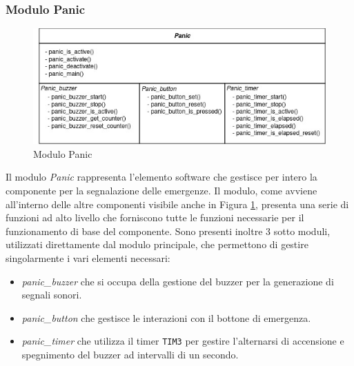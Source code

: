 \documentclass{article}
\begin{document}
	\subsubsection{Modulo Panic}
	\begin{figure}[ht]
		\centering
		\includegraphics[scale=0.4]{./images/Panic.jpg}
		\caption{Modulo Panic}
		\label{img:panic}
	\end{figure}
	\noindent Il modulo \textit{Panic} rappresenta l'elemento software che gestisce per intero la componente per la segnalazione delle emergenze.
	Il modulo, come avviene all'interno delle altre componenti visibile anche in Figura \ref{img:panic}, presenta una serie di funzioni ad alto livello che forniscono tutte le funzioni necessarie per il funzionamento di base del componente.
	Sono presenti inoltre 3 sotto moduli, utilizzati direttamente dal modulo principale, che permettono di gestire singolarmente i vari elementi necessari:
	\begin{itemize}
		\item \textit{panic\_buzzer} che si occupa della gestione del buzzer per la generazione di segnali sonori.
		\item \textit{panic\_button} che gestisce le interazioni con il bottone di emergenza.
		\item \textit{panic\_timer} che utilizza il timer \texttt{TIM3} per gestire l'alternarsi di accensione e spegnimento del buzzer ad intervalli di un secondo.
	\end{itemize}
	
\end{document}

